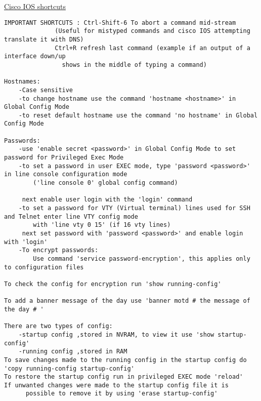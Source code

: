 \documentclass[../EngineeringJournal_CDavis.tex]{subfiles}
\begin{document}
\hspace{0.2cm}
\begin{tcolorbox}[width=6.3in]
  \href{http://etherealmind.com/cisco-ios-cli-shortcuts}{Cisco IOS shortcuts} 
\scriptsize 
\begin{verbatim}
IMPORTANT SHORTCUTS : Ctrl-Shift-6 To abort a command mid-stream 
			  (Useful for mistyped commands and cisco IOS attempting translate it with DNS)
		      Ctrl+R refresh last command (example if an output of a interface down/up 
			    shows in the middle of typing a command)

Hostnames:
	-Case sensitive
	-to change hostname use the command 'hostname <hostname>' in Global Config Mode
	-to reset default hostname use the command 'no hostname' in Global Config Mode

Passwords:
	-use 'enable secret <password>' in Global Config Mode to set password for Privileged Exec Mode
	-to set a password in user EXEC mode, type 'password <password>' in line console configuration mode 
		('line console 0' global config command)

	 next enable user login with the 'login' command
	-to set a password for VTY (Virtual terminal) lines used for SSH and Telnet enter line VTY config mode 
		with 'line vty 0 15' (if 16 vty lines)
	 next set password with 'password <password>' and enable login with 'login'
	-To encrypt passwords:
		Use command 'service password-encryption', this applies only to configuration files

To check the config for encryption run 'show running-config'

To add a banner message of the day use 'banner motd # the message of the day # '

There are two types of config:
	-startup config ,stored in NVRAM, to view it use 'show startup-config'
	-running config ,stored in RAM
To save changes made to the running config in the startup config do 'copy running-config startup-config'
To restore the startup config run in privileged EXEC mode 'reload'
If unwanted changes were made to the startup config file it is 
      possible to remove it by using 'erase startup-config'
\end{verbatim}
\end{tcolorbox}
\hspace{0.2cm}
\normalsize  
\end{document}
